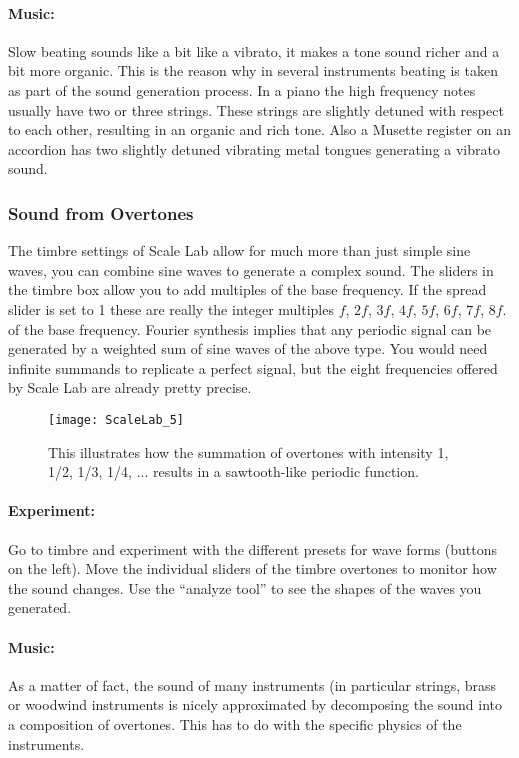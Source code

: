 \paragraph{Music:} Slow beating sounds like a bit like a vibrato, it makes a tone sound richer and a bit more organic. This is the reason why in several instruments beating is taken as part of the sound generation process. In a piano the high frequency notes usually have two or three strings. These strings are slightly detuned with respect to each other, resulting in an organic and rich tone. Also a Musette register on an accordion has two slightly detuned vibrating metal tongues generating a vibrato sound.

\subsubsection{Sound from Overtones}
The timbre settings of Scale Lab allow for much more than just simple sine waves, you can combine sine waves to generate a complex sound. The sliders in the timbre box allow you to add multiples of the base frequency. If the spread slider is set to 1 these are really the integer multiples $f$, $2f$, $3f$, $4f$, $5f$, $6f$, $7f$, $8f$. of the base frequency. Fourier synthesis implies that any periodic signal can be generated by a weighted sum of sine waves of the above type. You would need infinite summands to replicate a perfect signal, but the eight frequencies offered by Scale Lab are already pretty precise. 

\begin{figure}
\centering
\texttt{[image: ScaleLab\_5]}
\caption*{This illustrates how the summation of overtones with intensity 1, 1/2, 1/3, 1/4, ... results in a sawtooth-like periodic function.}
\end{figure}

\paragraph{Experiment:}
Go to timbre and experiment with the different presets for wave forms (buttons on the left). Move the individual sliders of the timbre overtones to monitor how the sound changes. Use the ``analyze tool'' to see the shapes of the waves you generated.

\paragraph{Music:}
As a matter of fact, the sound of many instruments (in particular strings, brass or woodwind instruments is nicely approximated by decomposing the sound into a composition of overtones. This has to do with the specific physics of the instruments. 

